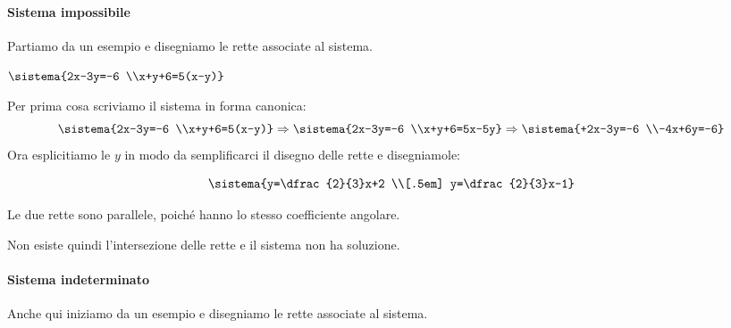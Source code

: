 \paragraph{Sistema impossibile}

Partiamo da un esempio e disegniamo le rette associate al sistema.

 \begin{esempio}{}{}
\(\sistema{2x-3y=-6 \\x+y+6=5(x-y)}\)
\vspace{1em}

Per prima cosa scriviamo il sistema in forma canonica:
\[
\sistema{2x-3y=-6 \\x+y+6=5(x-y)}\Rightarrow
\sistema{2x-3y=-6 \\x+y+6=5x-5y}\Rightarrow
\sistema{+2x-3y=-6 \\-4x+6y=-6}
\]
Ora esplicitiamo le \(y\) in modo da semplificarci il disegno delle rette e 
disegniamole:

\begin{minipage}{.48\textwidth}
\[\sistema{y=\dfrac{2}{3}x+2 \\[.5em] y=\dfrac{2}{3}x-1}\]

Le due rette sono parallele, poiché hanno lo stesso coefficiente angolare. 

Non esiste quindi l'intersezione delle rette e il sistema non ha soluzione.
\end{minipage}
\hfill
\begin{minipage}{.48\textwidth}
\begin{center}
\end{center}
\end{minipage}

\end{esempio}

\paragraph{Sistema indeterminato}

Anche qui iniziamo da un esempio e disegniamo le rette associate al sistema.

